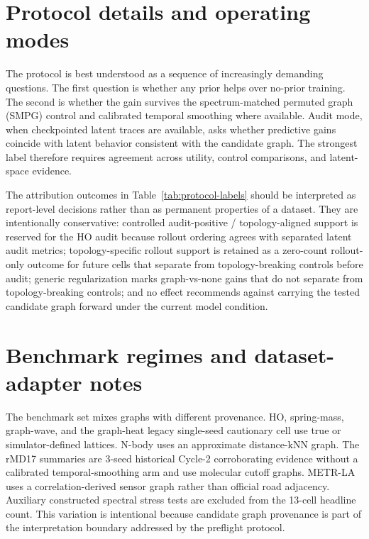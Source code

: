 \documentclass[preprint,12pt]{elsarticle}
\begin{document}
\FloatBarrier

\appendix

\section{Protocol details and operating modes}

The protocol is best understood as a sequence of increasingly demanding questions. The first question is whether any prior helps over no-prior training. The second is whether the gain survives the spectrum-matched permuted graph (SMPG) control and calibrated temporal smoothing where available. Audit mode, when checkpointed latent traces are available, asks whether predictive gains coincide with latent behavior consistent with the candidate graph. The strongest label therefore requires agreement across utility, control comparisons, and latent-space evidence.

The attribution outcomes in Table~\ref{tab:protocol-labels} should be interpreted as report-level decisions rather than as permanent properties of a dataset. They are intentionally conservative: controlled audit-positive / topology-aligned support is reserved for the HO audit because rollout ordering agrees with separated latent audit metrics; topology-specific rollout support is retained as a zero-count rollout-only outcome for future cells that separate from topology-breaking controls before audit; generic regularization marks graph-vs-none gains that do not separate from topology-breaking controls; and no effect recommends against carrying the tested candidate graph forward under the current model condition.

\section{Benchmark regimes and dataset-adapter notes}

The benchmark set mixes graphs with different provenance. HO, spring-mass, graph-wave, and the graph-heat legacy single-seed cautionary cell use true or simulator-defined lattices. N-body uses an approximate distance-kNN graph. The rMD17 summaries are 3-seed historical Cycle-2 corroborating evidence without a calibrated temporal-smoothing arm and use molecular cutoff graphs. METR-LA uses a correlation-derived  sensor graph rather than official road adjacency. Auxiliary constructed spectral stress tests are excluded from the 13-cell headline count. This variation is intentional because candidate graph provenance is part of the interpretation boundary addressed by the preflight protocol.
\end{document}

